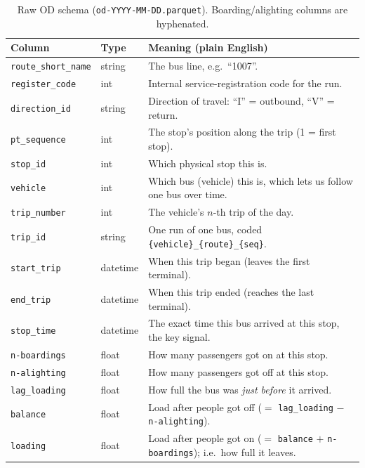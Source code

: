 \documentclass[11pt,a4paper]{article}
\begin{document}
\begin{table}[H]
\centering
\small
\caption{Raw OD schema (\texttt{od-YYYY-MM-DD.parquet}). Boarding/alighting columns are hyphenated.}
\label{tab:od}
\begin{tabular}{P{2.9cm}P{1.4cm}P{8.6cm}}
\toprule
Column & Type & Meaning (plain English) \\
\midrule
\texttt{route\_short\_name} & string & The bus line, e.g.\ ``1007''. \\
\texttt{register\_code}     & int    & Internal service-registration code for the run. \\
\texttt{direction\_id}      & string & Direction of travel: ``I'' = outbound, ``V'' = return. \\
\texttt{pt\_sequence}       & int    & The stop's position along the trip (1 = first stop). \\
\texttt{stop\_id}           & int    & Which physical stop this is. \\
\texttt{vehicle}            & int    & Which bus (vehicle) this is, which lets us follow one bus over time. \\
\texttt{trip\_number}       & int    & The vehicle's $n$-th trip of the day. \\
\texttt{trip\_id}           & string & One run of one bus, coded \texttt{\{vehicle\}\_\{route\}\_\{seq\}}. \\
\texttt{start\_trip}        & datetime & When this trip began (leaves the first terminal). \\
\texttt{end\_trip}          & datetime & When this trip ended (reaches the last terminal). \\
\texttt{stop\_time}         & datetime & The exact time this bus arrived at this stop, the key signal. \\
\texttt{n-boardings}        & float  & How many passengers got on at this stop. \\
\texttt{n-alighting}        & float  & How many passengers got off at this stop. \\
\texttt{lag\_loading}       & float  & How full the bus was \emph{just before} it arrived. \\
\texttt{balance}            & float  & Load after people got off ($=$ \texttt{lag\_loading} $-$ \texttt{n-alighting}). \\
\texttt{loading}            & float  & Load after people got on ($=$ \texttt{balance} $+$ \texttt{n-boardings}); i.e.\ how full it leaves. \\
\bottomrule
\end{tabular}
\end{table}
\end{document}
